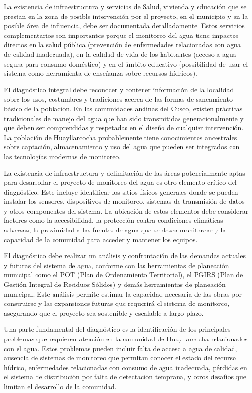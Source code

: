 La existencia de infraestructura y servicios de Salud, vivienda y educación que se prestan en la zona de posible intervención por el proyecto, en el municipio y en la posible área de influencia, debe ser documentada detalladamente. Estos servicios complementarios son importantes porque el monitoreo del agua tiene impactos directos en la salud pública (prevención de enfermedades relacionadas con agua de calidad inadecuada), en la calidad de vida de los habitantes (acceso a agua segura para consumo doméstico) y en el ámbito educativo (possibilidad de usar el sistema como herramienta de enseñanza sobre recursos hídricos).

El diagnóstico integral debe reconocer y contener información de la localidad sobre los usos, costumbres y tradiciones acerca de las formas de saneamiento básico de la población. En las comunidades andinas del Cusco, existen prácticas tradicionales de manejo del agua que han sido transmitidas generacionalmente y que deben ser comprendidas y respetadas en el diseño de cualquier intervención. La población de Huayllarcocha probablemente tiene conocimientos ancestrales sobre captación, almacenamiento y uso del agua que pueden ser integrados con las tecnologías modernas de monitoreo.



La existencia de infraestructura y delimitación de las áreas potencialmente aptas para desarrollar el proyecto de monitoreo del agua es otro elemento crítico del diagnóstico. Esto incluye identificar los sitios físicos generales donde se pueden instalar los sensores, dispositivos de monitoreo, sistemas de transmisión de datos y otros componentes del sistema. La ubicación de estos elementos debe considerar factores como la accesibilidad, la protección contra condiciones climáticas adversas, la proximidad a las fuentes de agua que se desea monitorear y la capacidad de la comunidad para acceder y mantener los equipos.

El diagnóstico debe realizar un análisis y confrontación de las demandas actuales y futuras del sistema de agua, conforme con las herramientas de planeación municipal como el POT (Plan de Ordenamiento Territorial), el PGIRS (Plan de Gestión Integral de Residuos Sólidos) y demás herramientas de planeación municipal. Este análisis permite estimar la capacidad necesaria de las obras por construirse y las expansiones futuras que requerirá el sistema de monitoreo, asegurando que el proyecto sea sostenible y escalable a largo plazo.

Una parte fundamental del diagnóstico es la identificación de los principales problemas que requieren atención en la comunidad de Huayllarcocha relacionados con el agua. Estos problemas pueden incluir falta de acceso a agua de calidad, ausencia de sistemas de monitoreo que permitan conocer el estado del recurso hídrico, enfermedades relacionadas con consumo de agua inadecuada, pérdidas en el sistema de distribución por falta de detectación temprana, y otros desafíos que limitan el desarrollo de la comunidad.

